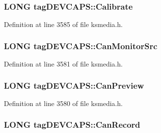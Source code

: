 \subsubsection[{\texorpdfstring{Calibrate}{Calibrate}}]{\setlength{\rightskip}{0pt plus 5cm}L\+O\+NG tag\+D\+E\+V\+C\+A\+P\+S\+::\+Calibrate}\hypertarget{structtag_d_e_v_c_a_p_s_aace759d9cfdbc031e6220916ec82c640}{}\label{structtag_d_e_v_c_a_p_s_aace759d9cfdbc031e6220916ec82c640}


Definition at line 3585 of file ksmedia.\+h.

\subsubsection[{\texorpdfstring{Can\+Monitor\+Src}{CanMonitorSrc}}]{\setlength{\rightskip}{0pt plus 5cm}L\+O\+NG tag\+D\+E\+V\+C\+A\+P\+S\+::\+Can\+Monitor\+Src}\hypertarget{structtag_d_e_v_c_a_p_s_a9d902bef91a8b6fd554ea42f522f00b4}{}\label{structtag_d_e_v_c_a_p_s_a9d902bef91a8b6fd554ea42f522f00b4}


Definition at line 3581 of file ksmedia.\+h.

\subsubsection[{\texorpdfstring{Can\+Preview}{CanPreview}}]{\setlength{\rightskip}{0pt plus 5cm}L\+O\+NG tag\+D\+E\+V\+C\+A\+P\+S\+::\+Can\+Preview}\hypertarget{structtag_d_e_v_c_a_p_s_a503404a3a421644fe506eccce475eaa9}{}\label{structtag_d_e_v_c_a_p_s_a503404a3a421644fe506eccce475eaa9}


Definition at line 3580 of file ksmedia.\+h.

\subsubsection[{\texorpdfstring{Can\+Record}{CanRecord}}]{\setlength{\rightskip}{0pt plus 5cm}L\+O\+NG tag\+D\+E\+V\+C\+A\+P\+S\+::\+Can\+Record}\hypertarget{structtag_d_e_v_c_a_p_s_a5b7a594bc9a2e8f19275b7c82e9f941c}{}\label{structtag_d_e_v_c_a_p_s_a5b7a594bc9a2e8f19275b7c82e9f941c}


